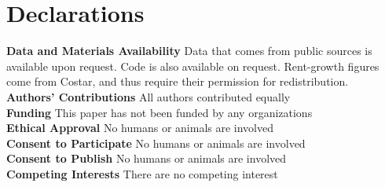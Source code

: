 \documentclass[pdflatex,sn-basic]{sn-jnl}%
\theoremstyle{thmstyleone}%
\theoremstyle{thmstyletwo}%
\theoremstyle{thmstylethree}%
\begin{document}
\section*{Declarations}
\textbf{Data and Materials Availability} Data that comes from public sources is available upon request. Code is also available on request. Rent-growth figures come from Costar, and thus require their permission for redistribution.\\
\textbf{Authors' Contributions} All authors contributed equally\\
\textbf{Funding} This paper has not been funded by any organizations\\
\textbf{Ethical Approval} No humans or animals are involved\\
\textbf{Consent to Participate} No humans or animals are involved\\
\textbf{Consent to Publish}  No humans or animals are involved\\
\textbf{Competing Interests} There are no competing interest\\
\newpage
\clearpage
\end{document}
